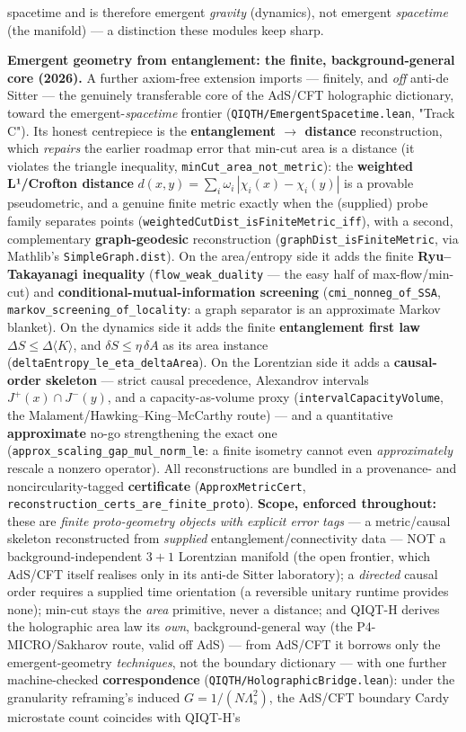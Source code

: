 \documentclass[11pt,a4paper]{article}
\begin{document}
spacetime and is therefore emergent \emph{gravity} (dynamics), not emergent \emph{spacetime} (the manifold) — a distinction these modules keep sharp.

\textbf{Emergent geometry from entanglement: the finite, background-general core (2026).} A further axiom-free extension imports — finitely, and \emph{off} anti-de Sitter — the genuinely transferable core of the AdS/CFT holographic dictionary, toward the emergent-\emph{spacetime} frontier (\texttt{QIQTH/EmergentSpacetime.lean}, "Track C"). Its honest centrepiece is the \textbf{entanglement $\to$ distance} reconstruction, which \emph{repairs} the earlier roadmap error that min-cut area is a distance (it violates the triangle inequality, \texttt{minCut\_area\_not\_metric}): the \textbf{weighted L¹/Crofton distance} $d(x,y)=\sum_i \omega_i\,|\chi_i(x)-\chi_i(y)|$ is a provable pseudometric, and a genuine finite metric exactly when the (supplied) probe family separates points (\texttt{weightedCutDist\_isFiniteMetric\_iff}), with a second, complementary \textbf{graph-geodesic} reconstruction (\texttt{graphDist\_isFiniteMetric}, via Mathlib's \texttt{SimpleGraph.dist}). On the area/entropy side it adds the finite \textbf{Ryu–Takayanagi inequality} (\texttt{flow\_weak\_duality} — the easy half of max-flow/min-cut) and \textbf{conditional-mutual-information screening} (\texttt{cmi\_nonneg\_of\_SSA}, \texttt{markov\_screening\_of\_locality}: a graph separator is an approximate Markov blanket). On the dynamics side it adds the finite \textbf{entanglement first law} $\Delta S\le\Delta\langle K\rangle$, and $\delta S\le\eta\,\delta A$ as its area instance (\texttt{deltaEntropy\_le\_eta\_deltaArea}). On the Lorentzian side it adds a \textbf{causal-order skeleton} — strict causal precedence, Alexandrov intervals $J^+(x)\cap J^-(y)$, and a capacity-as-volume proxy (\texttt{intervalCapacityVolume}, the Malament/Hawking–King–McCarthy route) — and a quantitative \textbf{approximate} no-go strengthening the exact one (\texttt{approx\_scaling\_gap\_mul\_norm\_le}: a finite isometry cannot even \emph{approximately} rescale a nonzero operator). All reconstructions are bundled in a provenance- and noncircularity-tagged \textbf{certificate} (\texttt{ApproxMetricCert}, \texttt{reconstruction\_certs\_are\_finite\_proto}). \textbf{Scope, enforced throughout:} these are \emph{finite proto-geometry objects with explicit error tags} — a metric/causal skeleton reconstructed from \emph{supplied} entanglement/connectivity data — NOT a background-independent $3{+}1$ Lorentzian manifold (the open frontier, which AdS/CFT itself realises only in its anti-de Sitter laboratory); a \emph{directed} causal order requires a supplied time orientation (a reversible unitary runtime provides none); min-cut stays the \emph{area} primitive, never a distance; and QIQT-H derives the holographic area law its \emph{own}, background-general way (the P4-MICRO/Sakharov route, valid off AdS) — from AdS/CFT it borrows only the emergent-geometry \emph{techniques}, not the boundary dictionary — with one further machine-checked \textbf{correspondence} (\texttt{QIQTH/HolographicBridge.lean}): under the granularity reframing's induced $G = 1/(N\Lambda_s^2)$, the AdS/CFT boundary Cardy microstate count coincides with QIQT-H's 
\end{document}
